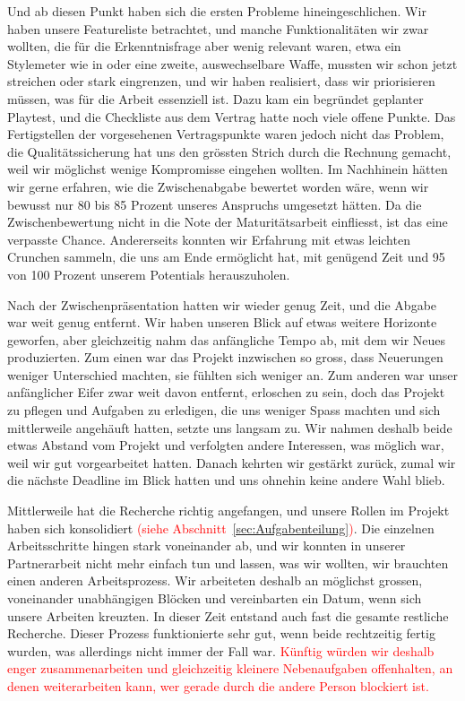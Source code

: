 \documentclass[../Main.tex]{subfiles}
\begin{document}
Und ab diesen Punkt haben sich die ersten Probleme hineingeschlichen. Wir haben unsere Featureliste betrachtet, und manche Funktionalitäten wir zwar wollten, die für die Erkenntnisfrage aber wenig relevant waren, etwa ein Stylemeter wie in \autocite{capcom_devilmaycry_2001} oder eine zweite, auswechselbare Waffe, mussten wir schon jetzt streichen oder stark eingrenzen, und wir haben realisiert, dass wir priorisieren müssen, was für die Arbeit essenziell ist. Dazu kam ein begründet geplanter Playtest, und die Checkliste aus dem Vertrag hatte noch viele offene Punkte. Das Fertigstellen der vorgesehenen Vertragspunkte waren jedoch nicht das Problem, die Qualitätssicherung hat uns den grössten Strich durch die Rechnung gemacht, weil wir möglichst wenige Kompromisse eingehen wollten. Im Nachhinein hätten wir gerne erfahren, wie die Zwischenabgabe bewertet worden wäre, wenn wir bewusst nur 80 bis 85 Prozent unseres Anspruchs umgesetzt hätten. Da die Zwischenbewertung nicht in die Note der Maturitätsarbeit einfliesst, ist das eine verpasste Chance. Andererseits konnten wir Erfahrung mit etwas leichten Crunchen sammeln, die uns am Ende ermöglicht hat, mit genügend Zeit und 95 von 100 Prozent unserem Potentials herauszuholen.

Nach der Zwischenpräsentation hatten wir wieder genug Zeit, und die Abgabe war weit genug entfernt. Wir haben unseren Blick auf etwas weitere Horizonte geworfen, aber gleichzeitig nahm das anfängliche Tempo ab, mit dem wir Neues produzierten. Zum einen war das Projekt inzwischen so gross, dass Neuerungen weniger Unterschied machten, sie fühlten sich weniger an. Zum anderen war unser anfänglicher Eifer zwar weit davon entfernt, erloschen zu sein, doch das Projekt zu pflegen und Aufgaben zu erledigen, die uns weniger Spass machten und sich mittlerweile angehäuft hatten, setzte uns langsam zu. Wir nahmen deshalb beide etwas Abstand vom Projekt und verfolgten andere Interessen, was möglich war, weil wir gut vorgearbeitet hatten. Danach kehrten wir gestärkt zurück, zumal wir die nächste Deadline im Blick hatten und uns ohnehin keine andere Wahl blieb.

Mittlerweile hat die Recherche richtig angefangen, und unsere Rollen im Projekt haben sich konsolidiert\textcolor{red}{ (siehe Abschnitt~\ref{sec:Aufgabenteilung})}. Die einzelnen Arbeitsschritte hingen stark voneinander ab, und wir konnten in unserer Partnerarbeit nicht mehr einfach tun und lassen, was wir wollten, wir brauchten einen anderen Arbeitsprozess. Wir arbeiteten deshalb an möglichst grossen, voneinander unabhängigen Blöcken und vereinbarten ein Datum, wenn sich unsere Arbeiten kreuzten. In dieser Zeit entstand auch fast die gesamte restliche Recherche. Dieser Prozess funktionierte sehr gut, wenn beide rechtzeitig fertig wurden, was allerdings nicht immer der Fall war. \textcolor{red}{Künftig würden wir deshalb enger zusammenarbeiten und gleichzeitig kleinere Nebenaufgaben offenhalten, an denen weiterarbeiten kann, wer gerade durch die andere Person blockiert ist.}
\end{document}
